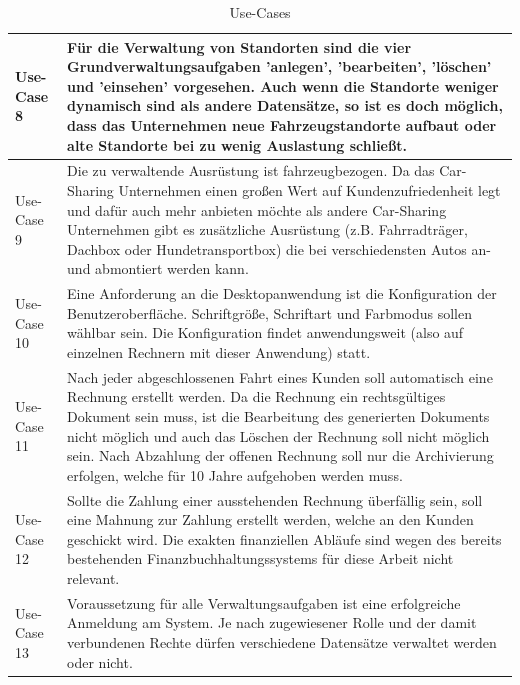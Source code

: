 \begin{table}[ht]

    \begin{onehalfspace}

    \begin{tabular}{l | p{12.5cm}}
        \hline
        Use-Case 8 & Für die Verwaltung von Standorten sind die vier Grundverwaltungsaufgaben 'anlegen', 'bearbeiten', 'löschen' und 'einsehen' vorgesehen. Auch wenn die Standorte weniger dynamisch sind als andere Datensätze, so ist es doch möglich, dass das Unternehmen neue Fahrzeugstandorte aufbaut oder alte Standorte bei zu wenig Auslastung schließt. \\
        \hline
        Use-Case 9 & Die zu verwaltende Ausrüstung ist fahrzeugbezogen. Da das Car-Sharing Unternehmen einen großen Wert auf Kundenzufriedenheit legt und dafür auch mehr anbieten möchte als andere Car-Sharing Unternehmen gibt es zusätzliche Ausrüstung (z.B. Fahrradträger, Dachbox oder Hundetransportbox) die bei verschiedensten Autos an- und abmontiert werden kann. \\
        \hline
        Use-Case 10 & Eine Anforderung an die Desktopanwendung ist die Konfiguration der Benutzeroberfläche. Schriftgröße, Schriftart und Farbmodus sollen wählbar sein. Die Konfiguration findet anwendungsweit (also auf einzelnen Rechnern mit dieser Anwendung) statt.\\
        \hline
        Use-Case 11 & Nach jeder abgeschlossenen Fahrt eines Kunden soll automatisch eine Rechnung erstellt werden. Da die Rechnung ein rechtsgültiges Dokument sein muss, ist die Bearbeitung des generierten Dokuments nicht möglich und auch das Löschen der Rechnung soll nicht möglich sein. Nach Abzahlung der offenen Rechnung soll nur die Archivierung erfolgen, welche für 10 Jahre aufgehoben werden muss.\\ 
        \hline
        Use-Case 12 & Sollte die Zahlung einer ausstehenden Rechnung überfällig sein, soll eine Mahnung zur Zahlung erstellt werden, welche an den Kunden geschickt wird. Die exakten finanziellen Abläufe sind wegen des bereits bestehenden Finanzbuchhaltungssystems für diese Arbeit nicht relevant. \\
        \hline
        Use-Case 13 & Voraussetzung für alle Verwaltungsaufgaben ist eine erfolgreiche Anmeldung am System. Je nach zugewiesener Rolle und der damit verbundenen Rechte dürfen verschiedene Datensätze verwaltet werden oder nicht.\\
        \hline

    \end{tabular}
    \caption{Use-Cases}
    \label{tbl:usecases3}

    \end{onehalfspace}
\end{table}

